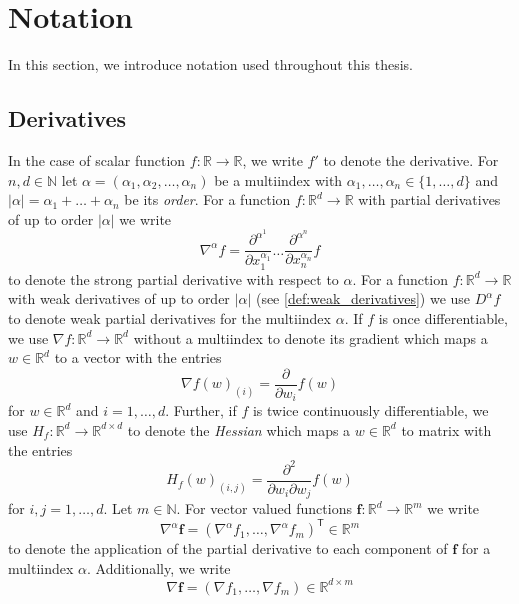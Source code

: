 \documentclass[12pt]{article}
\theoremstyle{definition}
\numberwithin{equation}{section}
\newcommand{\N}{\mathbb{N}}
\newcommand{\R}{\mathbb{R}}
\newcommand{\T}{\mathsf{T}}
\begin{document}
\section{Notation}
\label{sec:notation}
In this section, we introduce notation used throughout this thesis.
\subsection{Derivatives}
In the case of scalar function $f: \R \rightarrow \R$, we write $f'$ to denote the derivative.
For $n,d\in \N$ let $\alpha = (\alpha_1, \alpha_2, \dots, \alpha_n)$ be a multiindex with $\alpha_1,\dots,\alpha_n \in \{1,\dots,d\}$ and $|\alpha| = \alpha_1 + \dots + \alpha_n$ be its \emph{order}. For a function $f : \R^d \rightarrow \R$ with partial derivatives of up to order $|\alpha|$ we write
\begin{equation*}
  \nabla^{\alpha} f = \frac{\partial^{\alpha^1}}{\partial x_1^{\alpha_1}}\dots\frac{\partial^{\alpha^n}}{\partial x_n^{\alpha_n}} f
\end{equation*}
to denote the strong partial derivative with respect to $\alpha$. For a function $f:\R^d \rightarrow \R$  with weak derivatives of up to order $|\alpha|$ (see \autoref{def:weak_derivatives}) we use $D^{\alpha}f$ to denote weak partial derivatives for the multiindex $\alpha$. 
If $f$ is once differentiable, we use $\nabla f : \R^d \rightarrow \R^d$ without a multiindex to denote its gradient which maps a $w \in \R^d$ to a vector with the entries
\begin{equation*}
  \nabla f(w)_{(i)} = \frac{\partial}{\partial w_i} f(w)  
\end{equation*}
 for $w \in \R^d$ and $i=1,\dots,d$. Further, if $f$ is twice continuously differentiable, we use $H_f : \R^d \rightarrow \R^{d \times d}$ to denote the \emph{Hessian} which maps a $w \in \R^d$ to matrix with the entries 
 \begin{equation*}
  H_f(w)_{(i,j)} = \frac{\partial^2}{\partial w_i \partial w_j} f(w)
 \end{equation*}
 for $i,j=1,\dots,d$. Let $m \in \N$. For vector valued functions $\mathbf{f} : \R^d \rightarrow \R^m$ we write 
 \begin{equation*}
  \nabla^{\alpha}\mathbf{f} = (\nabla^{\alpha}f_1, \dots, \nabla^{\alpha}f_m)^\T \in \R^{m}
 \end{equation*}
 to denote the application of the partial derivative to each component of $\mathbf{f}$ for a multiindex $\alpha$. Additionally, we write 
 \begin{equation*}
  \nabla \mathbf{f} = (\nabla f_1, \dots, \nabla f_m) \in \R^{d \times m}
 \end{equation*}
\end{document}
